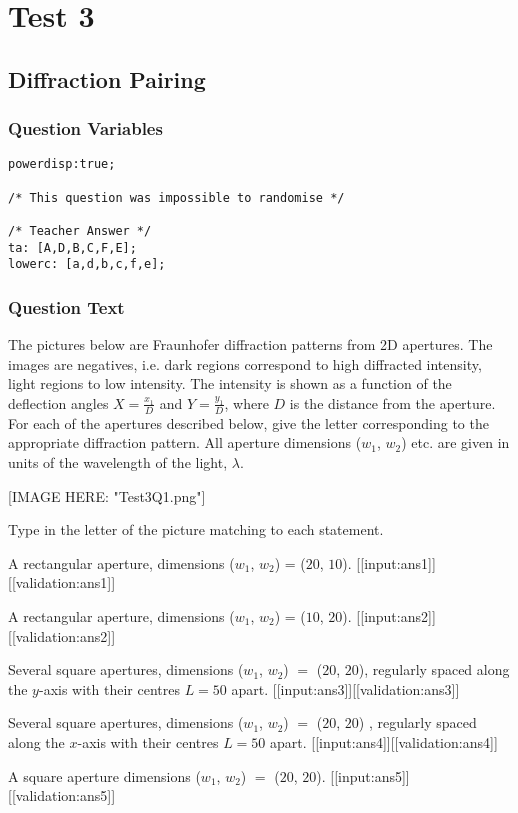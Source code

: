 \documentclass[a4paper,10pt]{article}
\begin{document}
\section{Test 3}
\subsection{Diffraction Pairing}
\subsubsection{Question Variables}
\begin{lstlisting}
powerdisp:true;

/* This question was impossible to randomise */

/* Teacher Answer */
ta: [A,D,B,C,F,E];
lowerc: [a,d,b,c,f,e];
\end{lstlisting}
\subsubsection{Question Text}
The pictures below are Fraunhofer diffraction patterns from 2D apertures. The images are negatives, i.e. dark regions correspond to high diffracted intensity, light regions to low intensity. The intensity is shown as a function of the deflection angles $X = \frac{x_1}{D}$ and $Y = \frac{y_1}{D}$, where $D$ is the distance from the aperture. For each of the apertures described below, give the letter corresponding to the appropriate diffraction pattern. All aperture dimensions ($w_1 $, $w_2$) etc. are given in units of the wavelength of the light, $\lambda$.

[IMAGE HERE: "Test3Q1.png"]

Type in the letter of the picture matching to each statement.

A rectangular aperture, dimensions ($w_1 $, $w_2$) = ($20$, $10$).   [[input:ans1]][[validation:ans1]]

A rectangular aperture, dimensions ($w_1$, $w_2$) = ($10$, $20$).   [[input:ans2]][[validation:ans2]]

Several square apertures, dimensions ($w_1 $, $w_2$) $=$ ($20$, $20$), regularly spaced along the $y$-axis with their centres $L=50$ apart.   [[input:ans3]][[validation:ans3]]

Several square apertures, dimensions ($w_1 $, $w_2$) $=$ ($20$, $20$) , regularly spaced along the $x$-axis with their centres $L=50$ apart.   [[input:ans4]][[validation:ans4]]

A square aperture dimensions ($w_1 $, $w_2$) $=$ ($20$, $20$).   [[input:ans5]][[validation:ans5]] 
\end{document}
